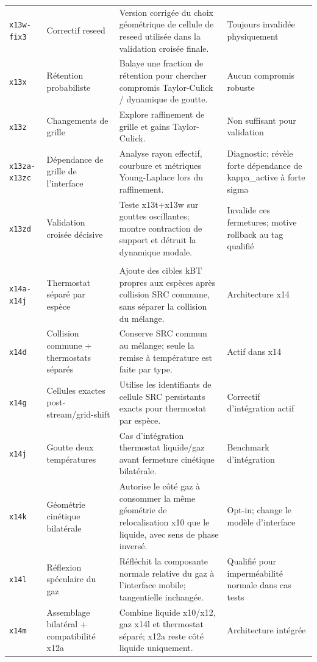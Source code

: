 \documentclass[a4paper,9pt]{article}
\begin{document}
\begin{landscape}
\begin{longtable}{L{2.35cm} L{5.3cm} L{13.25cm} L{4.75cm}}
\texttt{x13w-fix3} & Correctif reseed & Version corrigée du choix géométrique de cellule de reseed utilisée dans la validation croisée finale. & Toujours invalidée physiquement \\
\texttt{x13x} & Rétention probabiliste & Balaye une fraction de rétention pour chercher compromis Taylor-Culick / dynamique de goutte. & Aucun compromis robuste \\
\texttt{x13z} & Changements de grille & Explore raffinement de grille et gains Taylor-Culick. & Non suffisant pour validation \\
\texttt{x13za-x13zc} & Dépendance de grille de l'interface & Analyse rayon effectif, courbure et métriques Young-Laplace lors du raffinement. & Diagnostic; révèle forte dépendance de kappa\_active à forte sigma \\
\texttt{x13zd} & Validation croisée décisive & Teste x13t+x13w sur gouttes oscillantes; montre contraction de support et détruit la dynamique modale. & Invalide ces fermetures; motive rollback au tag qualifié \\
\\
\texttt{x14a-x14j} & Thermostat séparé par espèce & Ajoute des cibles kBT propres aux espèces après collision SRC commune, sans séparer la collision du mélange. & Architecture x14 \\
\texttt{x14d} & Collision commune + thermostats séparés & Conserve SRC commun au mélange; seule la remise à température est faite par type. & Actif dans x14 \\
\texttt{x14g} & Cellules exactes post-stream/grid-shift & Utilise les identifiants de cellule SRC persistants exacts pour thermostat par espèce. & Correctif d'intégration actif \\
\texttt{x14j} & Goutte deux températures & Cas d'intégration thermostat liquide/gaz avant fermeture cinétique bilatérale. & Benchmark d'intégration \\
\texttt{x14k} & Géométrie cinétique bilatérale & Autorise le côté gaz à consommer la même géométrie de relocalisation x10 que le liquide, avec sens de phase inversé. & Opt-in; change le modèle d'interface \\
\texttt{x14l} & Réflexion spéculaire du gaz & Réfléchit la composante normale relative du gaz à l'interface mobile; tangentielle inchangée. & Qualifié pour imperméabilité normale dans cas tests \\
\texttt{x14m} & Assemblage bilatéral + compatibilité x12a & Combine liquide x10/x12, gaz x14l et thermostat séparé; x12a reste côté liquide uniquement. & Architecture intégrée \\

\end{longtable}
\end{landscape}
\end{document}
